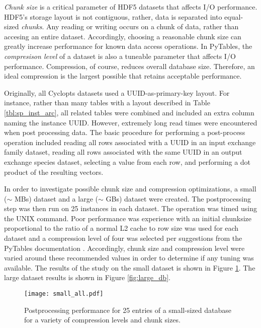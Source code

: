 \textit{Chunk size} is a critical parameter of HDF5 datasets that affects I/O
performance. HDF5's storage layout is not contiguous, rather, data is separated
into equal-sized \textit{chunks}. Any reading or writing occurs on a chunk of
data, rather than accesing an entire dataset. Accordingly, choosing a reasonable
chunk size can greatly increase performance for known data access operations. In
PyTables, the \textit{compresison level} of a dataset is also a tuneable
parameter that affects I/O performance. Compression, of course, reduces overall
database size. Therefore, an ideal compression is the largest possible that
retains acceptable performance.

Originally, all Cyclopts datasets used a UUID-as-primary-key layout. For
instance, rather than many tables with a layout described in Table
\ref{tbl:sp_inst_arc}, all related tables were combined and included an extra
column naming the instance UUID. However, extremely long read times were
encountered when post processing data. The basic procedure for performing a
post-process operation included reading all rows associated with a UUID in an
input exchange family dataset, reading all rows associated with the same UUID in
an output exchange species dataset, selecting a value from each row, and
performing a dot product of the resulting vectors. 

In order to investigate possible chunk size and compression optimizations, a
small ($\sim$ MBs) dataset and a large ($\sim$ GBs) dataset were created. The
postprocessing step was then run on 25 instances in each dataset. The operation
was timed using the UNIX  command. Poor performance was experience
with an initial chunksize proportional to the ratio of a normal L2 cache to row
size was used for each dataset and a compression level of four was selected per
suggestions from the PyTables documentation \cite{tablesopt}. Accordingly, chunk
size and compression level were varied around these recommended values in order
to determine if any tuning was available. The results of the study on the small
dataset is shown in Figure \ref{fig:small_db}. The large dataset results is
shown in Figure \ref{fig:large_db}.

\begin{figure}
  \begin{center}
    \texttt{[image: small\_all.pdf]}
    \caption[]{
      \label{fig:small_db}
      Postprocessing performance for 25 entries of a small-sized database for a 
      variety of compression levels and chunk sizes.}
  \end{center}
\end{figure}


